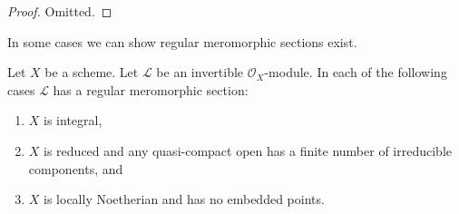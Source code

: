 \begin{proof}
Omitted.
\end{proof}

\noindent
In some cases we can show regular meromorphic sections exist.

\begin{lemma}
\label{lemma-regular-meromorphic-section-exists}
Let $X$ be a scheme.
Let $\mathcal{L}$ be an invertible $\mathcal{O}_X$-module.
In each of the following cases $\mathcal{L}$ has a regular meromorphic
section:
\begin{enumerate}
\item $X$ is integral,
\item $X$ is reduced and any quasi-compact open has a finite
number of irreducible components, and
\item $X$ is locally Noetherian and has no embedded points.
\end{enumerate}
\end{lemma}

